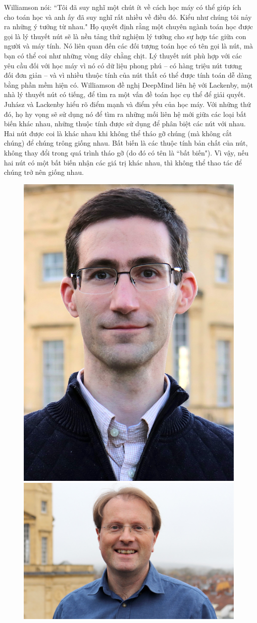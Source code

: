 \begin{multicols}{2}
	\vskip 0.05cm
	Williamson nói: ``Tôi đã suy nghĩ một chút ít về cách học máy có thể giúp ích cho toán học và anh ấy đã suy nghĩ rất nhiều về điều đó. Kiểu như chúng tôi nảy ra những ý tưởng từ nhau."
	\vskip 0.05cm
	Họ quyết định rằng một chuyên ngành toán học được gọi là lý thuyết nút sẽ là nền tảng thử nghiệm lý tưởng cho sự hợp tác giữa con người và máy tính. Nó liên quan đến các đối tượng toán học có tên gọi là nút, mà bạn có thể coi như những vòng dây chằng chịt. Lý thuyết nút phù hợp với các yêu cầu đối với học máy vì nó có dữ liệu phong phú -- có hàng triệu nút tương đối đơn giản -- và vì nhiều thuộc tính của nút thắt có thể được tính toán dễ dàng bằng phần mềm hiện có.
	\vskip 0.05cm
	Williamson đề nghị DeepMind liên hệ với Lackenby, một nhà lý thuyết nút có tiếng, để tìm ra một vấn đề toán học cụ thể để giải quyết.
	\vskip 0.05cm	
	Juhász và Lackenby hiểu rõ điểm mạnh và điểm yếu của học máy. Với những thứ đó, họ hy vọng sẽ sử dụng nó để tìm ra những mối liên hệ mới giữa các loại bất biến khác nhau, những thuộc tính được sử dụng để phân biệt các nút với nhau.
	\vskip 0.05cm
	Hai nút được coi là khác nhau khi không thể tháo gỡ chúng (mà không cắt chúng) để chúng trông giống nhau. Bất biến là các thuộc tính bản chất của nút, không thay đổi trong quá trình tháo gỡ (do đó có tên là ``bất biến"). Vì vậy, nếu hai nút có một bất biến nhận các giá trị khác nhau, thì không thể thao tác để chúng trở nên giống nhau.
	\begin{figure}[H]
		\centering
		\vspace*{-5pt}
		\captionsetup{labelformat= empty, justification=centering}
		\includegraphics[height=0.425\linewidth]{3}
		\includegraphics[height=0.425\linewidth]{4}

\end{figure}
\end{multicols}
